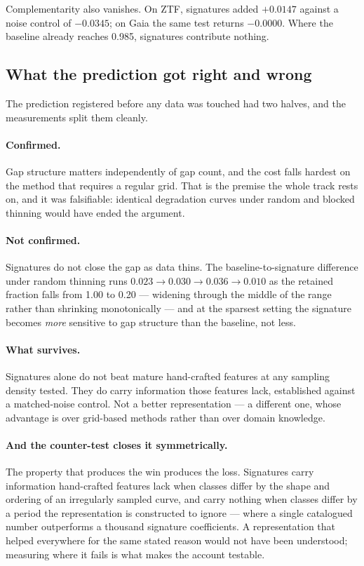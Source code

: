 \documentclass[11pt,a4paper]{report}
\begin{document}
Complementarity also vanishes. On ZTF, signatures added $+0.0147$ against a noise control of
$-0.0345$; on Gaia the same test returns $-0.0000$. Where the baseline already reaches 0.985,
signatures contribute nothing.

\subsection{What the prediction got right and wrong}

The prediction registered before any data was touched had two halves, and the measurements
split them cleanly.

\paragraph{Confirmed.} Gap structure matters independently of gap count, and the cost falls
hardest on the method that requires a regular grid. That is the premise the whole track
rests on, and it was falsifiable: identical degradation curves under random and blocked
thinning would have ended the argument.

\paragraph{Not confirmed.} Signatures do not close the gap as data thins. The
baseline-to-signature difference under random thinning runs $0.023 \to 0.030 \to 0.036 \to
0.010$ as the retained fraction falls from 1.00 to 0.20 --- widening through the middle of
the range rather than shrinking monotonically --- and at the sparsest setting the signature
becomes \emph{more} sensitive to gap structure than the baseline, not less.

\paragraph{What survives.} Signatures alone do not beat mature hand-crafted features at any
sampling density tested. They do carry information those features lack, established against
a matched-noise control. Not a better representation --- a different one, whose advantage
is over grid-based methods rather than over domain knowledge.

\paragraph{And the counter-test closes it symmetrically.} The property that produces the win
produces the loss. Signatures carry information hand-crafted features lack when classes
differ by the shape and ordering of an irregularly sampled curve, and carry nothing when
classes differ by a period the representation is constructed to ignore --- where a single
catalogued number outperforms a thousand signature coefficients. A representation that helped
everywhere for the same stated reason would not have been understood; measuring where it
fails is what makes the account testable.
\end{document}
